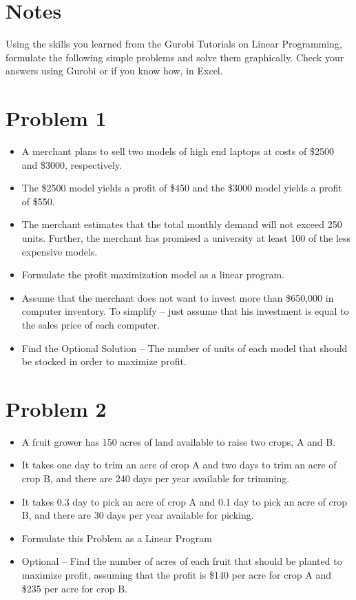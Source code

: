 \documentclass[12pt,letterpaper]{article}
\begin{document}
\section*{Notes}
Using the skills you learned from the Gurobi Tutorials on Linear Programming, formulate the following simple problems and solve them graphically. Check your answers using Gurobi or if you know how, in Excel. 

\section*{Problem 1}

\begin{itemize}
    \item A merchant  plans  to  sell  two  models  of high end laptops  at 
costs of \$2500 and \$3000, respectively.
\item The \$2500 model yields a
profit  of  \$450  and  the  \$3000  model  yields  a  profit  of  \$550. 
\item The merchant  estimates  that  the  total  monthly  demand will not exceed 250 units. Further, the merchant has promised a university at least 100 of the less expensive models. 
\item Formulate the profit maximization model as a linear program. 
\item Assume  that
the  merchant  does  not  want  to  invest  more  than  \$650,000  in
computer inventory. To simplify -- just assume that his investment is equal to the sales price of each computer. 
\item Find the Optional Solution -- The number of units of each model that should  be  stocked  in  order  to  maximize  profit.  

\end{itemize}   

\newpage
\section*{Problem 2}

\begin{itemize}

\item A fruit  grower  has  150  acres  of  land  available  to  raise two crops, A and B. 
\item It takes one day to trim an acre of crop A and two days to trim an acre of crop B, and there are 240 days per year available for trimming. 
\item It takes 0.3 day to pick an acre of
crop A and 0.1 day to pick an acre of crop B, and there are 30 days  per  year  available  for  picking.  
\item Formulate this Problem as a Linear Program 
\item Optional -- Find  the  number  of  acres of each fruit that should be planted to maximize profit,  assuming  that  the  profit is \$140  per  acre  for  crop A and  \$235
per acre for crop B.

\end{itemize}
\end{document}
